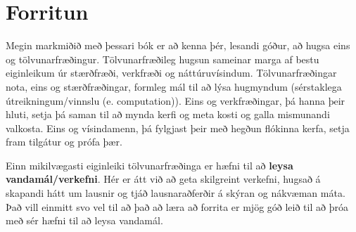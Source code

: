






\chapter{Forritun}

Megin markmiðið með þessari bók er að kenna þér, lesandi góður, að hugsa eins og tölvunarfræðingur.
Tölvunarfræðileg hugsun sameinar marga af bestu eiginleikum úr stærðfræði, verkfræði og náttúruvísindum.
Tölvunarfræðingar nota, eins og stærðfræðingar, formleg mál til að lýsa hugmyndum (sérstaklega útreikningum/vinnslu (e. computation)).
Eins og verkfræðingar, þá hanna þeir hluti, setja þá saman til að mynda kerfi og meta kosti og galla mismunandi valkosta.
Eins og vísindamenn, þá fylgjast þeir með hegðun flókinna kerfa, setja fram tilgátur og prófa þær. 

Einn mikilvægasti eiginleiki tölvunarfræðinga er hæfni til að {\bf leysa vandamál/verkefni}.
Hér er átt við að geta skilgreint verkefni, hugsað á skapandi hátt um lausnir og tjáð lausnaraðferðir á skýran og nákvæman máta.
Það vill einmitt svo vel til að það að læra að forrita er mjög góð leið til að þróa með sér hæfni til að leysa vandamál.

